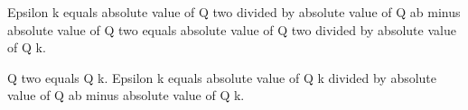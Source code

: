 Epsilon k equals absolute value of Q two divided by absolute value of Q ab minus absolute value of Q two equals absolute value of Q two divided by absolute value of Q k.  

Q two equals Q k.  
Epsilon k equals absolute value of Q k divided by absolute value of Q ab minus absolute value of Q k.